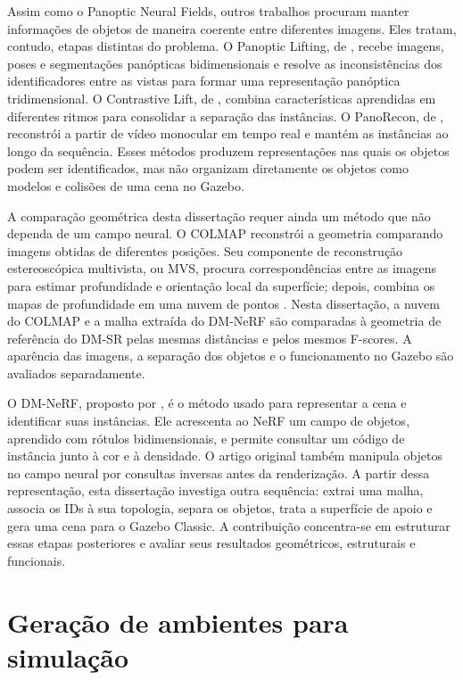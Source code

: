 Assim como o Panoptic Neural Fields, outros trabalhos procuram manter informações de objetos de maneira coerente entre diferentes imagens. Eles tratam, contudo, etapas distintas do problema. O Panoptic Lifting, de \citet{siddiqui2023panoptic}, recebe imagens, poses e segmentações panópticas bidimensionais e resolve as inconsistências dos identificadores entre as vistas para formar uma representação panóptica tridimensional. O Contrastive Lift, de \citet{bhalgat2023contrastive}, combina características aprendidas em diferentes ritmos para consolidar a separação das instâncias. O PanoRecon, de \citet{wu2024panorecon}, reconstrói a partir de vídeo monocular em tempo real e mantém as instâncias ao longo da sequência. Esses métodos produzem representações nas quais os objetos podem ser identificados, mas não organizam diretamente os objetos como modelos e colisões de uma cena no Gazebo.

A comparação geométrica desta dissertação requer ainda um método que não dependa de um campo neural. O COLMAP reconstrói a geometria comparando imagens obtidas de diferentes posições. Seu componente de reconstrução estereoscópica multivista, ou MVS, procura correspondências entre as imagens para estimar profundidade e orientação local da superfície; depois, combina os mapas de profundidade em uma nuvem de pontos \citep{schonberger2016mvs}. Nesta dissertação, a nuvem do COLMAP e a malha extraída do DM-NeRF são comparadas à geometria de referência do DM-SR pelas mesmas distâncias e pelos mesmos F-scores. A aparência das imagens, a separação dos objetos e o funcionamento no Gazebo são avaliados separadamente.

O DM-NeRF, proposto por \citet{wang2023dmnerf}, é o método usado para representar a cena e identificar suas instâncias. Ele acrescenta ao NeRF um campo de objetos, aprendido com rótulos bidimensionais, e permite consultar um código de instância junto à cor e à densidade. O artigo original também manipula objetos no campo neural por consultas inversas antes da renderização. A partir dessa representação, esta dissertação investiga outra sequência: extrai uma malha, associa os IDs à sua topologia, separa os objetos, trata a superfície de apoio e gera uma cena para o Gazebo Classic. A contribuição concentra-se em estruturar essas etapas posteriores e avaliar seus resultados geométricos, estruturais e funcionais.

\section{Geração de ambientes para simulação}

